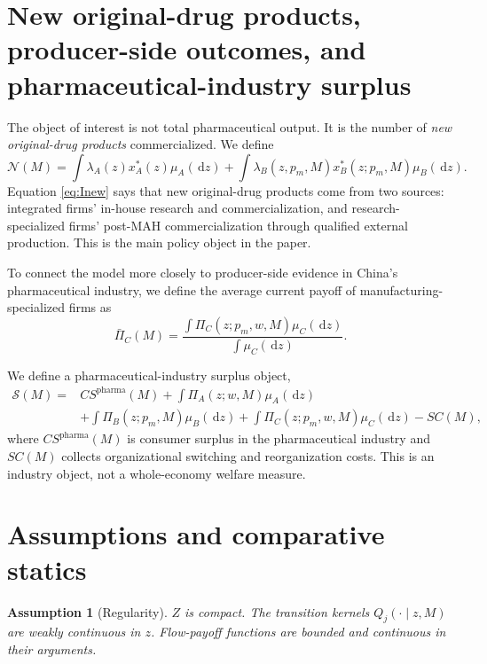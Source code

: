 \documentclass[12pt]{article}
\newtheorem{assumption}{Assumption}
\newcommand{\1}{\mathbf{1}}
\newcommand{\dd}{\,\mathrm{d}}
\newcommand{\Inew}{\mathcal{N}}
\newcommand{\Surp}{\mathcal{S}}
\begin{document}
\section{New original-drug products, producer-side outcomes, and pharmaceutical-industry surplus}

The object of interest is not total pharmaceutical output. It is the number of \emph{new original-drug products} commercialized. We define
\begin{equation}
\Inew(M)=
\int \lambda_A(z)x_A^*(z)\mu_A(\dd z)
+
\int \lambda_B(z,p_m,M)x_B^*(z;p_m,M)\mu_B(\dd z).
\label{eq:Inew}
\end{equation}
Equation \eqref{eq:Inew} says that new original-drug products come from two sources: integrated firms' in-house research and commercialization, and research-specialized firms' post-MAH commercialization through qualified external production. This is the main policy object in the paper.

To connect the model more closely to producer-side evidence in China's pharmaceutical industry, we define the average current payoff of manufacturing-specialized firms as
\begin{equation}
\bar\Pi_C(M)=\frac{\int \Pi_C(z;p_m,w,M)\mu_C(\dd z)}{\int \mu_C(\dd z)}.
\end{equation}

We define a pharmaceutical-industry surplus object,
\begin{equation}
\begin{aligned}
\Surp(M)={}&CS^{\mathrm{pharma}}(M)+\int \Pi_A(z;w,M)\mu_A(\dd z)\\
&+\int \Pi_B(z;p_m,M)\mu_B(\dd z)+\int \Pi_C(z;p_m,w,M)\mu_C(\dd z)-SC(M),
\end{aligned}
\label{eq:industry_surplus}
\end{equation}
where $CS^{\mathrm{pharma}}(M)$ is consumer surplus in the pharmaceutical industry and $SC(M)$ collects organizational switching and reorganization costs. This is an industry object, not a whole-economy welfare measure.

\section{Assumptions and comparative statics}

\begin{assumption}[Regularity]
$Z$ is compact. The transition kernels $Q_j(\cdot\mid z,M)$ are weakly continuous in $z$. Flow-payoff functions are bounded and continuous in their arguments.
\end{assumption}
\end{document}

